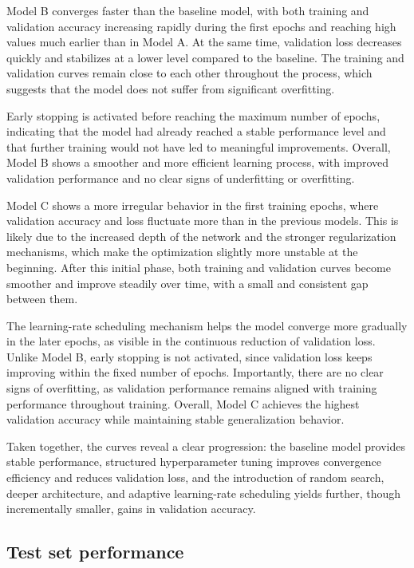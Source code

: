 \documentclass[11pt,a4paper]{article}
\begin{document}
Model B converges faster than the baseline model, with both training and validation accuracy increasing rapidly during the first epochs and reaching high values much earlier than in Model A. At the same time, validation loss decreases quickly and stabilizes at a lower level compared to the baseline. The training and validation curves remain close to each other throughout the process, which suggests that the model does not suffer from significant overfitting.

Early stopping is activated before reaching the maximum number of epochs, indicating that the model had already reached a stable performance level and that further training would not have led to meaningful improvements. Overall, Model B shows a smoother and more efficient learning process, with improved validation performance and no clear signs of underfitting or overfitting.

Model C shows a more irregular behavior in the first training epochs, where validation accuracy and loss fluctuate more than in the previous models. This is likely due to the increased depth of the network and the stronger regularization mechanisms, which make the optimization slightly more unstable at the beginning. After this initial phase, both training and validation curves become smoother and improve steadily over time, with a small and consistent gap between them.

The learning-rate scheduling mechanism helps the model converge more gradually in the later epochs, as visible in the continuous reduction of validation loss. Unlike Model B, early stopping is not activated, since validation loss keeps improving within the fixed number of epochs. Importantly, there are no clear signs of overfitting, as validation performance remains aligned with training performance throughout training. Overall, Model C achieves the highest validation accuracy while maintaining stable generalization behavior.

Taken together, the curves reveal a clear progression: the baseline model provides stable performance, structured hyperparameter tuning improves convergence efficiency and reduces validation loss, and the introduction of random search, deeper architecture, and adaptive learning-rate scheduling yields further, though incrementally smaller, gains in validation accuracy.

\subsection{Test set performance}
\end{document}

